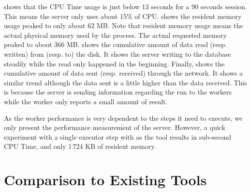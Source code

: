  shows that the CPU Time usage is just below 13 seconds for a 90 seconds session.
This means the server only uses about 15\% of CPU.
 shows the resident memory usage peaked to only about 62 MB.
Note that resident memory usage means the actual physical memory used by the process.
The actual requested memory peaked to about 366 MB.
 shows the cumulative amount of data read (resp. written) from (resp. to) the disk.
It shows the server writing to the database steadily while the read only happened in the beginning.
Finally,  shows the cumulative amount of data sent (resp. received) through the network.
It shows a similar trend although the data sent is a little higher than the data received.
This is because the server is sending information regarding the run to the workers while the worker only reports a small amount of result.

As the worker performance is very dependent to the steps it need to execute, we only present the performance measurement of the server.
However, a quick experiment with a single executor step with  as the tool results in sub-second CPU Time, and only 1\,724 KB of resident memory.

\section{Comparison to Existing Tools}
\label{sec:eval.comparison}

